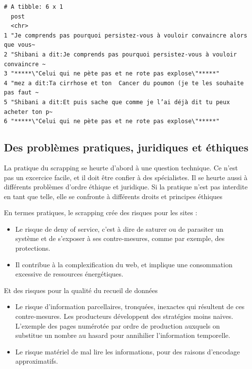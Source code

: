 \documentclass[
  letterpaper,
  DIV=11,
  numbers=noendperiod]{scrreprt}
\providecommand{\tightlist}{%
  \setlength{\itemsep}{0pt}\setlength{\parskip}{0pt}}\usepackage{longtable,booktabs,array}
\begin{document}
\begin{verbatim}
# A tibble: 6 x 1
  post                                                                          
  <chr>                                                                         
1 "Je comprends pas pourquoi persistez-vous à vouloir convaincre alors que vous~
2 "Shibani a dit:Je comprends pas pourquoi persistez-vous à vouloir convaincre ~
3 "*****\"Celui qui ne pète pas et ne rote pas explose\"*****"                  
4 "mez a dit:Ta cirrhose et ton  Cancer du poumon (je te les souhaite pas faut ~
5 "Shibani a dit:Et puis sache que comme je l’ai déjà dit tu peux acheter ton p~
6 "*****\"Celui qui ne pète pas et ne rote pas explose\"*****"                  
\end{verbatim}

\subsection{Des problèmes pratiques, juridiques et
éthiques}\label{des-probluxe8mes-pratiques-juridiques-et-uxe9thiques}

La pratique du scrapping se heurte d'abord à une question technique. Ce
n'est pas un excercice facile, et il doit être confier à des
spécialistes. Il se heurte aussi à différents problèmes d'ordre éthique
et juridique. Si la pratique n'est pas interdite en tant que telle, elle
se confronte à différents droits et principes éthiques

En termes pratiques, le scrapping crée des risques pour les sites :

\begin{itemize}
\tightlist
\item
  Le risque de deny of service, c'est à dire de saturer ou de parasiter
  un système et de s'exposer à ses contre-mesures, comme par exemple,
  des protections.
\item
  Il contribue à la complexification du web, et implique une
  consommation excessive de ressources énergétiques.
\end{itemize}

Et des risques pour la qualité du recueil de données

\begin{itemize}
\tightlist
\item
  Le risque d'information parcellaires, tronquées, inexactes qui
  résultent de ces contre-mesures. Les producteurs développent des
  stratégies moins naives. L'exemple des pages numérotée par ordre de
  production auxquels on substitue un nombre au hasard pour annihilier
  l'information temporelle.
\item
  Le risque matériel de mal lire les informations, pour des raisons
  d'encodage approximatifs.
\end{itemize}
\end{document}
